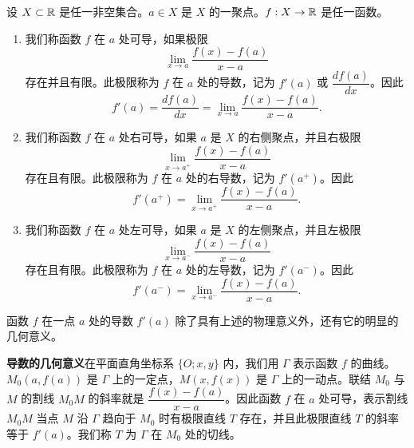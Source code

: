 \begin{mydef*}{}

	设 \(X\subset\mathbb{R}\) 是任一非空集合。\(a\in X\) 是 \(X\) 的一聚点。\(f:X\to\mathbb{R}\) 是任一函数。

	\begin{enumerate}[label=\arabic*)]
		\item 我们称函数 \(f\) 在 \(a\) 处可导，如果极限
		\[
		\lim_{x\to a}\frac{f(x)-f(a)}{x-a}
		\]
		存在并且有限。此极限称为 \(f\) 在 \(a\) 处的导数，记为 \(f'(a)\) 或 \(\dfrac{df(a)}{dx}\)。因此
		\[
		f'(a)=\frac{df(a)}{dx}=\lim_{x\to a}\frac{f(x)-f(a)}{x-a}.
		\]

		\item 我们称函数 \(f\) 在 \(a\) 处右可导，如果 \(a\) 是 \(X\) 的右侧聚点，并且右极限
		\[
		\lim_{x\to a^+}\frac{f(x)-f(a)}{x-a}
		\]
		存在且有限。此极限称为 \(f\) 在 \(a\) 处的右导数，记为 \(f'(a^+)\)。因此
		\[
		f'(a^+)=\lim_{x\to a^+}\frac{f(x)-f(a)}{x-a}.
		\]

		\item 我们称函数 \(f\) 在 \(a\) 处左可导，如果 \(a\) 是 \(X\) 的左侧聚点，并且左极限
		\[
		\lim_{x\to a^-}\frac{f(x)-f(a)}{x-a}
		\]
		存在且有限。此极限称为 \(f\) 在 \(a\) 处的左导数，记为 \(f'(a^-)\)。因此
		\[
		f'(a^-)=\lim_{x\to a^-}\frac{f(x)-f(a)}{x-a}.
		\]
	\end{enumerate}

\end{mydef*}

函数 \(f\) 在一点 \(a\) 处的导数 \(f'(a)\) 除了具有上述的物理意义外，还有它的明显的几何意义。

\textbf{导数的几何意义}\quad 在平面直角坐标系 \(\{O;x,y\}\) 内，我们用 \(\Gamma\) 表示函数 \(f\) 的曲线。\(M_0(a,f(a))\) 是 \(\Gamma\) 上的一定点，\(M(x,f(x))\) 是 \(\Gamma\) 上的一动点。联结 \(M_0\) 与 \(M\) 的割线 \(M_0M\) 的斜率就是 \(\dfrac{f(x)-f(a)}{x-a}\)。因此函数 \(f\) 在 \(a\) 处可导，表示割线 \(M_0M\) 当点 \(M\) 沿 \(\Gamma\) 趋向于 \(M_0\) 时有极限直线 \(T\) 存在，并且此极限直线 \(T\) 的斜率等于 \(f'(a)\)。我们称 \(T\) 为 \(\Gamma\) 在 \(M_0\) 处的切线。

